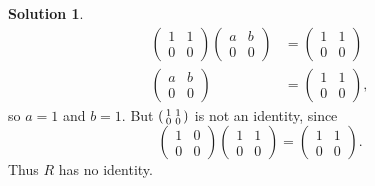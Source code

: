 \documentclass{article}
\theoremstyle{definition}
\newtheorem*{solution}{Solution}
\begin{document}
\begin{enumerate}
\begin{solution}
\begin{align*}
\begin{pmatrix} 1 & 1 \\ 0 & 0 \end{pmatrix} \begin{pmatrix} a & b \\ 0 & 0 \end{pmatrix} &= \begin{pmatrix} 1 & 1 \\ 0 & 0 \end{pmatrix} \\
\begin{pmatrix} a & b \\ 0 & 0 \end{pmatrix} &= \begin{pmatrix} 1 & 1 \\ 0 & 0 \end{pmatrix},
\end{align*}
so $a=1$ and $b=1$.  But $\begin{psmallmatrix} 1 & 1 \\ 0 & 0\end{psmallmatrix}$ is not an identity, since
\[
\begin{pmatrix} 1 & 0 \\ 0 & 0 \end{pmatrix} \begin{pmatrix} 1 & 1 \\ 0 & 0 \end{pmatrix} = \begin{pmatrix} 1 & 1 \\ 0 & 0 \end{pmatrix}.
\]
Thus $R$ has no identity.


\end{solution}
\end{enumerate}
\end{document}
